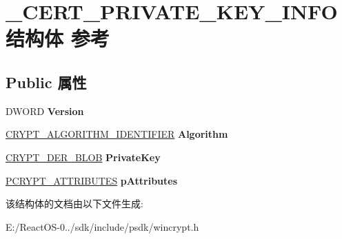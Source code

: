 \hypertarget{struct___c_e_r_t___p_r_i_v_a_t_e___k_e_y___i_n_f_o}{}\section{\+\_\+\+C\+E\+R\+T\+\_\+\+P\+R\+I\+V\+A\+T\+E\+\_\+\+K\+E\+Y\+\_\+\+I\+N\+F\+O结构体 参考}
\label{struct___c_e_r_t___p_r_i_v_a_t_e___k_e_y___i_n_f_o}
\subsection*{Public 属性}
\begin{DoxyCompactItemize}
\item 
\mbox{\label{struct___c_e_r_t___p_r_i_v_a_t_e___k_e_y___i_n_f_o_ac92c183d8222c3d62d09d546afcc03b9}} 
D\+W\+O\+RD {\bfseries Version}
\item 
\mbox{\label{struct___c_e_r_t___p_r_i_v_a_t_e___k_e_y___i_n_f_o_a72c10dead2043ae2882fcfed2bf4a7f6}} 
\hyperlink{struct___c_r_y_p_t___a_l_g_o_r_i_t_h_m___i_d_e_n_t_i_f_i_e_r}{C\+R\+Y\+P\+T\+\_\+\+A\+L\+G\+O\+R\+I\+T\+H\+M\+\_\+\+I\+D\+E\+N\+T\+I\+F\+I\+ER} {\bfseries Algorithm}
\item 
\mbox{\label{struct___c_e_r_t___p_r_i_v_a_t_e___k_e_y___i_n_f_o_adf544583445bd24910f4631bcfafa282}} 
\hyperlink{struct___c_r_y_p_t_o_a_p_i___b_l_o_b}{C\+R\+Y\+P\+T\+\_\+\+D\+E\+R\+\_\+\+B\+L\+OB} {\bfseries Private\+Key}
\item 
\mbox{\label{struct___c_e_r_t___p_r_i_v_a_t_e___k_e_y___i_n_f_o_afd6232119f11f0e8ca456702962b53ee}} 
\hyperlink{struct___c_r_y_p_t___a_t_t_r_i_b_u_t_e_s}{P\+C\+R\+Y\+P\+T\+\_\+\+A\+T\+T\+R\+I\+B\+U\+T\+ES} {\bfseries p\+Attributes}
\end{DoxyCompactItemize}


该结构体的文档由以下文件生成\+:\begin{DoxyCompactItemize}
\item 
E\+:/\+React\+O\+S-\/0../sdk/include/psdk/wincrypt.\+h\end{DoxyCompactItemize}
